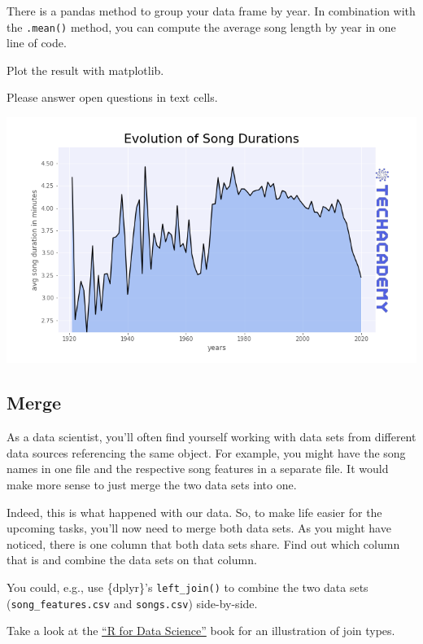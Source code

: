 \documentclass[
  11pt,
]{book}
\newenvironment{tips}[1]
  {
  \begin{itemize}
  \footnotesize
  \renewcommand{\labelitemi}{
    \raisebox{-.7\height}[0pt][0pt]{
      {\setkeys{Gin}{width=3em,keepaspectratio}
        \texttt{[image: images/\#1.png]}}
    }
  }
  \setlength{\fboxsep}{1em}
  \begin{rbox}
  \item
  }
  {
  \end{rbox}
  \end{itemize}
  }
\newenvironment{tipsp}[1]
  {
  \begin{itemize}
  \footnotesize
  \renewcommand{\labelitemi}{
    \raisebox{-.7\height}[0pt][0pt]{
      {\setkeys{Gin}{width=3em,keepaspectratio}
        \texttt{[image: images/\#1.png]}}
    }
  }
  \setlength{\fboxsep}{1em}
  \begin{pbox}
  \item
  }
  {
  \end{pbox}
  \end{itemize}
  }
\begin{document}
\begin{tipsp}p

There is a pandas method to group your data frame by year. In combination with the \texttt{.mean()} method, you can compute the average song length by year in one line of code.

Plot the result with matplotlib.

Please answer open questions in text cells.

\end{tipsp}

\begin{center}\includegraphics[width=1\linewidth]{splots/durations_over_time} \end{center}

\hypertarget{merge}{%
\subsection{Merge}\label{merge}}

As a data scientist, you'll often find yourself working with data sets from different data sources referencing the same object. For example, you might have the song names in one file and the respective song features in a separate file. It would make more sense to just merge the two data sets into one.

Indeed, this is what happened with our data. So, to make life easier for the upcoming tasks, you'll now need to merge both data sets.
As you might have noticed, there is one column that both data sets share. Find out which column that is and combine the data sets on that column.

\begin{tips}r

You could, e.g., use \{dplyr\}'s \texttt{left\_join()} to combine the two data sets (\texttt{song\_features.csv} and \texttt{songs.csv}) side-by-side.

Take a look at the \href{https://r4ds.had.co.nz/relational-data.html\#understanding-joins}{``R for Data Science''} book for an illustration of join types.

\end{tips}
\end{document}
